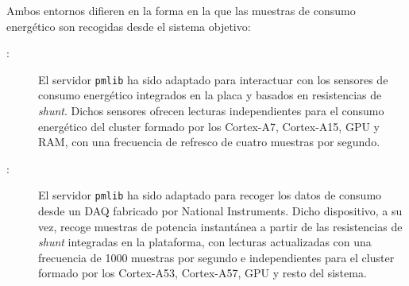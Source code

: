 Ambos entornos difieren en la forma en la que las muestras de consumo energético son recogidas desde el sistema objetivo:

\begin{description}

\item[\odroid:] El servidor {\tt pmlib} ha sido adaptado para interactuar
  con los sensores de consumo energético integrados en la placa y basados
  en resistencias de {\em shunt}. Dichos sensores ofrecen lecturas
  independientes para el consumo energético del cluster formado por los
  Cortex-A7, Cortex-A15, GPU y RAM, con una frecuencia de refresco de
  cuatro muestras por segundo.

\item[\juno:] El servidor {\tt pmlib} ha sido adaptado para recoger los
  datos de consumo desde un DAQ fabricado por National Instruments. Dicho
  dispositivo, a su vez, recoge muestras de potencia instantánea a partir
  de las resistencias de {\em shunt} integradas en la plataforma, con
  lecturas actualizadas con una frecuencia de 1000 muestras por segundo e
  independientes para el cluster formado por los Cortex-A53, Cortex-A57,
  GPU y resto del sistema.

\end{description}

